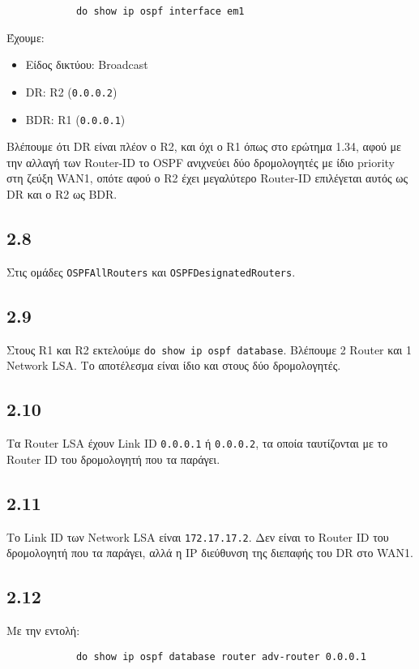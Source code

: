 \documentclass[a4paper, 12pt]{article}
\begin{document}
		\begin{verbatim}
			do show ip ospf interface em1
		\end{verbatim}
		
		Έχουμε:
		
		\begin{itemize}
			\item Είδος δικτύου: Broadcast
			\item DR: R2 (\verb|0.0.0.2|)
			\item BDR: R1 (\verb|0.0.0.1|)
		\end{itemize}

		Βλέπουμε ότι DR είναι πλέον ο R2, και όχι ο R1 όπως στο ερώτημα 1.34, αφού με την αλλαγή των Router-ID το OSPF ανιχνεύει δύο δρομολογητές με ίδιο priority στη ζεύξη WAN1, οπότε αφού ο R2 έχει μεγαλύτερο Router-ID επιλέγεται αυτός ως DR και ο R2 ως BDR.
		
	\subsection*{2.8}
		Στις ομάδες \verb|OSPFAllRouters| και \verb|OSPFDesignatedRouters|.

	\subsection*{2.9}
		Στους R1 και R2 εκτελούμε \verb|do show ip ospf database|. Βλέπουμε 2 Router και 1 Network LSA. Το αποτέλεσμα είναι ίδιο και στους δύο δρομολογητές. 

	\subsection*{2.10}
		Τα Router LSA έχουν Link ID \verb|0.0.0.1| ή \verb|0.0.0.2|, τα οποία ταυτίζονται με το Router ID του δρομολογητή που τα παράγει.

	\subsection*{2.11}
		Το Link ID των Network LSA είναι \verb|172.17.17.2|. Δεν είναι το Router ID του δρομολογητή που τα παράγει, αλλά η IP διεύθυνση της διεπαφής του DR στο WAN1.

	\subsection*{2.12}
		Με την εντολή: 
		
		\begin{verbatim}
			do show ip ospf database router adv-router 0.0.0.1
		\end{verbatim}
\end{document}
